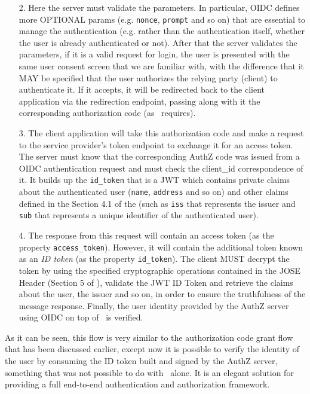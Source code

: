 \begin{itemize}
    \item[2.] Here the server must validate the parameters. In particular, OIDC defines more OPTIONAL params (e.g. \texttt{nonce}, \texttt{prompt} and so on) that are essential to manage the authentication (e.g. rather than the authentication itself, whether the user is already authenticated or not). After that the server validates the parameters, if it is a valid request for login, the user is presented with the same user consent screen that we are familiar with, with the difference that it MAY be specified that the user authorizes the relying party (client) to authenticate it. If it accepts, it will be redirected back to the client application via the redirection endpoint, passing along with it the corresponding authorization code (as \oauth\ requires).
    \item[3.] The client application will take this authorization code and make a request to the service provider's token endpoint to exchange it for an access token. The server must know that the corresponding AuthZ code was issued from a OIDC authentication request and must check the client\_id correspondence of it. It builds up the \texttt{id\_token} that is a JWT which contains private claims about the authenticated user (\texttt{name}, \texttt{address} and so on) and other claims defined in the Section 4.1 of the  \cite{RFC7519} (such as \texttt{iss} that represents the issuer and \texttt{sub} that represents a unique identifier of the authenticated user).
    \item[4.] The response from this request will contain an access token (as the property \texttt{access\_token}). However, it will contain the additional token known as an \textit{ID token} (as the property \texttt{id\_token}). The client MUST decrypt the token by using the specified cryptographic operations contained in the JOSE Header (Section 5 of ), validate the JWT ID Token and retrieve the claims about the user, the issuer and so on, in order to ensure the truthfulness of the message response. Finally, the user identity provided by the AuthZ server using OIDC on top of \oauth\ is verified.
\end{itemize}


As it can be seen, this flow is very similar to the authorization code grant flow that has been discussed earlier, except now it is possible to verify the identity of the user by consuming the ID token built and signed by the AuthZ server, something that was not possible to do with \oauth\ alone. It is an elegant solution for providing a full end-to-end authentication and authorization framework.

